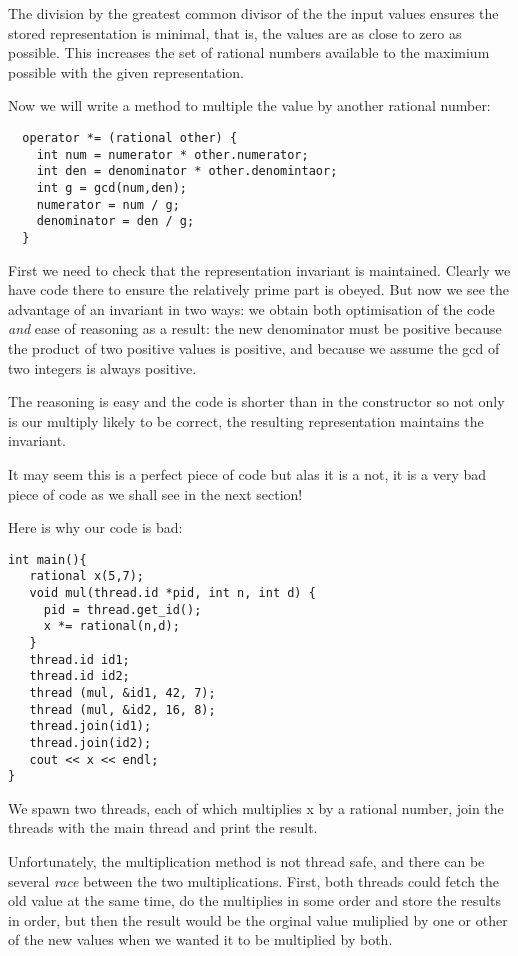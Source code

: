 \documentclass[oneside]{book}
\theoremstyle{plain}
\theoremstyle{definition}
\theoremstyle{plain}
\begin{document}
The division by the greatest common divisor of the the input
values ensures the stored representation is minimal, that is,
the values are as close to zero as possible. This increases the
set of rational numbers available to the maximium possible
with the given representation.

Now we will write a method to multiple the value by another rational
number:

\begin{verbatim}
  operator *= (rational other) { 
    int num = numerator * other.numerator;
    int den = denominator * other.denomintaor;
    int g = gcd(num,den);
    numerator = num / g;
    denominator = den / g;
  }
\end{verbatim}
First we need to check that the representation invariant is maintained.
Clearly we have code there to ensure the relatively prime part is obeyed.
But now we see the advantage of an invariant in two ways: we obtain
both optimisation of the code {\em and} ease of reasoning as a result:
the new denominator must be positive because the product of two positive
values is positive, and because we assume the gcd of two integers is always
positive.

The reasoning is easy and the code is shorter than in the constructor
so not only is our multiply likely to be correct, the resulting representation
maintains the invariant.

It may seem this is a perfect piece of code but alas it is a not,
it is a very bad piece of code as we shall see in the next section!

Here is why our code is bad:
\begin{verbatim}
int main(){
   rational x(5,7);
   void mul(thread.id *pid, int n, int d) { 
     pid = thread.get_id(); 
     x *= rational(n,d);
   }
   thread.id id1;
   thread.id id2;
   thread (mul, &id1, 42, 7);
   thread (mul, &id2, 16, 8);
   thread.join(id1);
   thread.join(id2);
   cout << x << endl;
}
\end{verbatim}

We spawn two threads, each of which multiplies x by a rational number,
join the threads with the main thread and print the result.

Unfortunately, the multiplication method is not thread safe, and there
can be several {\em race} between the two multiplications. First,
both threads could fetch the old value at the same time, do the multiplies
in some order and store the results in order, but then the result would
be the orginal value muliplied by one or other of the new values when
we wanted it to be multiplied by both.
\end{document}
